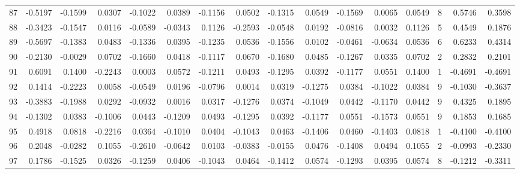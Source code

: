 \begin{tabular}{lrrrrrrrrrrrrrrr}
87  &     -0.5197 & -0.1599 &  0.0307 & -0.1022 &  0.0389 & -0.1156 &  0.0502 & -0.1315 &  0.0549 & -0.1569 &   0.0065 &     0.0549 &      8 &                    0.5746 &                     0.3598 \\
88  &     -0.3423 & -0.1547 &  0.0116 & -0.0589 & -0.0343 &  0.1126 & -0.2593 & -0.0548 &  0.0192 & -0.0816 &   0.0032 &     0.1126 &      5 &                    0.4549 &                     0.1876 \\
89  &     -0.5697 & -0.1383 &  0.0483 & -0.1336 &  0.0395 & -0.1235 &  0.0536 & -0.1556 &  0.0102 & -0.0461 &  -0.0634 &     0.0536 &      6 &                    0.6233 &                     0.4314 \\
90  &     -0.2130 & -0.0029 &  0.0702 & -0.1660 &  0.0418 & -0.1117 &  0.0670 & -0.1680 &  0.0485 & -0.1267 &   0.0335 &     0.0702 &      2 &                    0.2832 &                     0.2101 \\
91  &      0.6091 &  0.1400 & -0.2243 &  0.0003 &  0.0572 & -0.1211 &  0.0493 & -0.1295 &  0.0392 & -0.1177 &   0.0551 &     0.1400 &      1 &                   -0.4691 &                    -0.4691 \\
92  &      0.1414 & -0.2223 &  0.0058 & -0.0549 &  0.0196 & -0.0796 &  0.0014 &  0.0319 & -0.1275 &  0.0384 &  -0.1022 &     0.0384 &      9 &                   -0.1030 &                    -0.3637 \\
93  &     -0.3883 & -0.1988 &  0.0292 & -0.0932 &  0.0016 &  0.0317 & -0.1276 &  0.0374 & -0.1049 &  0.0442 &  -0.1170 &     0.0442 &      9 &                    0.4325 &                     0.1895 \\
94  &     -0.1302 &  0.0383 & -0.1006 &  0.0443 & -0.1209 &  0.0493 & -0.1295 &  0.0392 & -0.1177 &  0.0551 &  -0.1573 &     0.0551 &      9 &                    0.1853 &                     0.1685 \\
95  &      0.4918 &  0.0818 & -0.2216 &  0.0364 & -0.1010 &  0.0404 & -0.1043 &  0.0463 & -0.1406 &  0.0460 &  -0.1403 &     0.0818 &      1 &                   -0.4100 &                    -0.4100 \\
96  &      0.2048 & -0.0282 &  0.1055 & -0.2610 & -0.0642 &  0.0103 & -0.0383 & -0.0155 &  0.0476 & -0.1408 &   0.0494 &     0.1055 &      2 &                   -0.0993 &                    -0.2330 \\
97  &      0.1786 & -0.1525 &  0.0326 & -0.1259 &  0.0406 & -0.1043 &  0.0464 & -0.1412 &  0.0574 & -0.1293 &   0.0395 &     0.0574 &      8 &                   -0.1212 &                    -0.3311 \\

\end{tabular}
